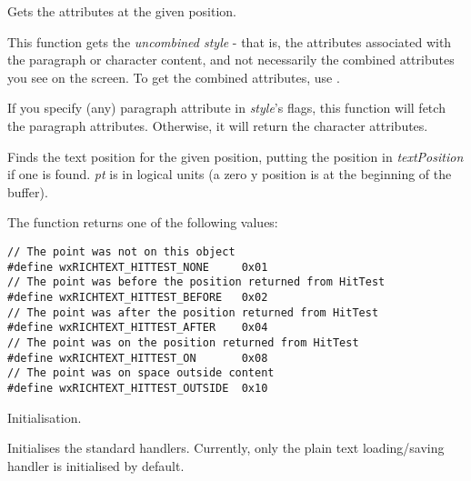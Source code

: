 Gets the attributes at the given position.

This function gets the {\it uncombined style} - that is, the attributes associated with the
paragraph or character content, and not necessarily the combined attributes you see on the
screen. To get the combined attributes, use .

If you specify (any) paragraph attribute in {\it style}'s flags, this function will fetch
the paragraph attributes. Otherwise, it will return the character attributes.

\label{wxrichtextbufferhittest}


Finds the text position for the given position, putting the position in {\it textPosition} if
one is found. {\it pt} is in logical units (a zero y position is
at the beginning of the buffer).

The function returns one of the following values:

{\small
\begin{verbatim}
// The point was not on this object
#define wxRICHTEXT_HITTEST_NONE     0x01
// The point was before the position returned from HitTest
#define wxRICHTEXT_HITTEST_BEFORE   0x02
// The point was after the position returned from HitTest
#define wxRICHTEXT_HITTEST_AFTER    0x04
// The point was on the position returned from HitTest
#define wxRICHTEXT_HITTEST_ON       0x08
// The point was on space outside content
#define wxRICHTEXT_HITTEST_OUTSIDE  0x10
\end{verbatim}
}

\label{wxrichtextbufferinit}


Initialisation.

\label{wxrichtextbufferinitstandardhandlers}


Initialises the standard handlers. Currently, only the plain text loading/saving handler
is initialised by default.

\label{wxrichtextbufferinserthandler}



